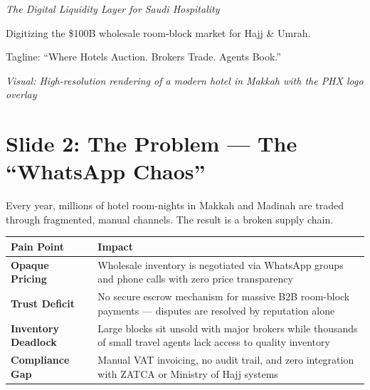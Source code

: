 \documentclass[11pt,a4paper]{article}
\begin{document}
{\large \textit{The Digital Liquidity Layer for Saudi Hospitality}}

\vspace{0.5cm}

Digitizing the \$100B wholesale room-block market for Hajj \& Umrah.

\vspace{0.3cm}

Tagline: ``Where Hotels Auction. Brokers Trade. Agents Book.''

\vspace{0.3cm}

\textit{Visual: High-resolution rendering of a modern hotel in Makkah with the PHX logo overlay}

\newpage

\section*{Slide 2: The Problem --- The ``WhatsApp Chaos''}

Every year, millions of hotel room-nights in Makkah and Madinah are traded through fragmented, manual channels. The result is a broken supply chain.

\vspace{0.5cm}

\begin{center}
\begin{tabular}{|>{\raggedright\arraybackslash}p{3.5cm}|>{\raggedright\arraybackslash}p{10.5cm}|}
\hline
\rowcolor{headergray}
\textbf{Pain Point} & \textbf{Impact} \\
\hline
\textbf{Opaque Pricing} & Wholesale inventory is negotiated via WhatsApp groups and phone calls with zero price transparency \\
\hline
\textbf{Trust Deficit} & No secure escrow mechanism for massive B2B room-block payments --- disputes are resolved by reputation alone \\
\hline
\textbf{Inventory Deadlock} & Large blocks sit unsold with major brokers while thousands of small travel agents lack access to quality inventory \\
\hline
\textbf{Compliance Gap} & Manual VAT invoicing, no audit trail, and zero integration with ZATCA or Ministry of Hajj systems \\
\hline
\end{tabular}
\end{center}

\vspace{0.5cm}
\end{document}
